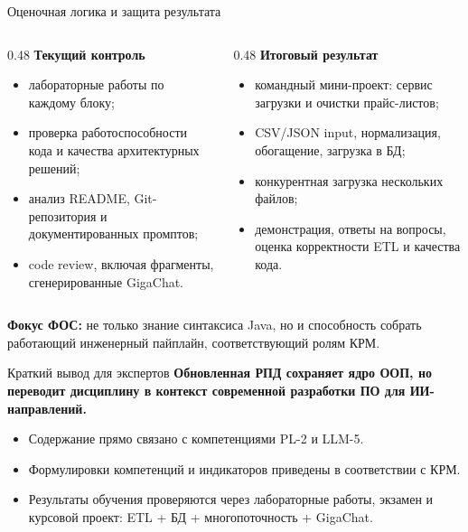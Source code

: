 \documentclass[aspectratio=169,10pt]{beamer}
\newcommand{\smallgap}{\vspace{0.35em}}
\begin{document}
\begin{frame}{Оценочная логика и защита результата}
\begin{columns}[T,onlytextwidth]
\begin{column}{0.48\textwidth}
\textbf{Текущий контроль}
\begin{itemize}
  \item лабораторные работы по каждому блоку;
  \item проверка работоспособности кода и качества архитектурных решений;
  \item анализ README, Git-репозитория и документированных промптов;
  \item code review, включая фрагменты, сгенерированные GigaChat.
\end{itemize}
\end{column}
\begin{column}{0.48\textwidth}
\textbf{Итоговый результат}
\begin{itemize}
  \item командный мини-проект: сервис загрузки и очистки прайс-листов;
  \item CSV/JSON input, нормализация, обогащение, загрузка в БД;
  \item конкурентная загрузка нескольких файлов;
  \item демонстрация, ответы на вопросы, оценка корректности ETL и качества кода.
\end{itemize}
\end{column}
\end{columns}
\smallgap
\textbf{Фокус ФОС:} не только знание синтаксиса Java, но и способность собрать работающий инженерный пайплайн, соответствующий ролям КРМ.
\end{frame}

\begin{frame}{Краткий вывод для экспертов}
\Large
\textbf{Обновленная РПД сохраняет ядро ООП, но переводит дисциплину в контекст современной разработки ПО для ИИ-направлений.}

\vspace{1em}
\normalsize
\begin{itemize}
  \item Содержание прямо связано с компетенциями PL-2 и LLM-5.
  \item Формулировки компетенций и индикаторов приведены в соответствии с КРМ.
  \item Результаты обучения проверяются через лабораторные работы, экзамен и курсовой проект: ETL + БД + многопоточность + GigaChat.
\end{itemize}
\end{frame}
\end{document}
